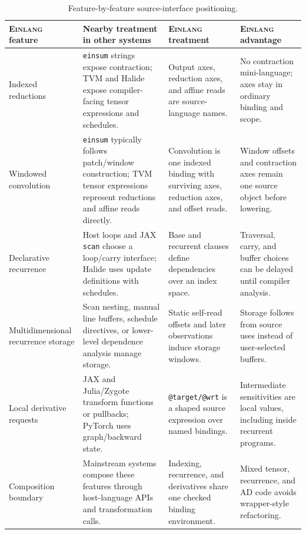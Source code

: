 \documentclass[sigplan,screen,nonacm]{acmart}
\newcommand{\einlang}{\textsc{Einlang}}
\begin{document}
\begin{table}[t]
\centering
\caption{Feature-by-feature source-interface positioning.}
\label{tab:feature-positioning}
\renewcommand{\arraystretch}{1.06}
\setlength{\tabcolsep}{4pt}
\begin{tabular*}{\textwidth}{@{\extracolsep{\fill}}L{0.20\textwidth}L{0.31\textwidth}L{0.23\textwidth}L{0.18\textwidth}@{}}
\toprule
\einlang{} feature & Nearby treatment in other systems & \einlang{} treatment & \einlang{} advantage \\
\midrule
Indexed reductions & \texttt{einsum} strings expose contraction; TVM and Halide expose compiler-facing tensor expressions and schedules. & Output axes, reduction axes, and affine reads are source-language names. & No contraction mini-language; axes stay in ordinary binding and scope. \\
Windowed convolution & \texttt{einsum} typically follows patch/window construction; TVM tensor expressions represent reductions and affine reads directly. & Convolution is one indexed binding with surviving axes, reduction axes, and offset reads. & Window offsets and contraction axes remain one source object before lowering. \\
Declarative recurrence & Host loops and JAX \texttt{scan} choose a loop/carry interface; Halide uses update definitions with schedules. & Base and recurrent clauses define dependencies over an index space. & Traversal, carry, and buffer choices can be delayed until compiler analysis. \\
Multidimensional recurrence storage & Scan nesting, manual line buffers, schedule directives, or lower-level dependence analysis manage storage. & Static self-read offsets and later observations induce storage windows. & Storage follows from source uses instead of user-selected buffers. \\
Local derivative requests & JAX and Julia/Zygote transform functions or pullbacks; PyTorch uses graph/backward state. & \texttt{@target/@wrt} is a shaped source expression over named bindings. & Intermediate sensitivities are local values, including inside recurrent programs. \\
Composition boundary & Mainstream systems compose these features through host-language APIs and transformation calls. & Indexing, recurrence, and derivatives share one checked binding environment. & Mixed tensor, recurrence, and AD code avoids wrapper-style refactoring. \\
\bottomrule
\end{tabular*}
\end{table}
\end{document}
